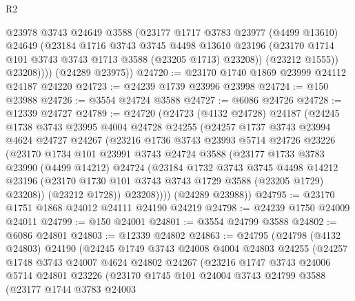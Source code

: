 \begin{lexlean}{R2}
\begin{coremodule}
              @23978
              @3743
              @24649
              @3588
              (@23177
                @1717
                @3783
                @23977
                (@4499 @13610)
                @24649
                (@23184
                  @1716
                  @3743
                  @3745
                  @4498
                  @13610
                  @23196
                  (@23170 @1714 @101 @3743 @3743 @1713 @3588 (@23205 @1713) @23208))
                (@23212 @1555))
              @23208))))
      (@24289 @23975))
@24720 := @23170 @1740 @1869 @23999 @24112 @24187 @24220
@24723 := @24239 @1739 @23996 @23998
@24724 := @150 @23988
@24726 := @3554 @24724 @3588
@24727 := @6086 @24726
@24728 := @12339 @24727
@24789 := @24720
    (@24723
      (@4132 @24728)
      @24187
      (@24245
        @1738
        @3743
        @23995
        @4004
        @24728
        @24255
        (@24257
          @1737
          @3743
          @23994
          @4624
          @24727
          @24267
          (@23216
            @1736
            @3743
            @23993
            @5714
            @24726
            @23226
            (@23170
              @1734
              @101
              @23991
              @3743
              @24724
              @3588
              (@23177
                @1733
                @3783
                @23990
                (@4499 @14212)
                @24724
                (@23184
                  @1732
                  @3743
                  @3745
                  @4498
                  @14212
                  @23196
                  (@23170 @1730 @101 @3743 @3743 @1729 @3588 (@23205 @1729) @23208))
                (@23212 @1728))
              @23208))))
      (@24289 @23988))
@24795 := @23170 @1751 @1868 @24012 @24111 @24190 @24219
@24798 := @24239 @1750 @24009 @24011
@24799 := @150 @24001
@24801 := @3554 @24799 @3588
@24802 := @6086 @24801
@24803 := @12339 @24802
@24863 := @24795
    (@24798
      (@4132 @24803)
      @24190
      (@24245
        @1749
        @3743
        @24008
        @4004
        @24803
        @24255
        (@24257
          @1748
          @3743
          @24007
          @4624
          @24802
          @24267
          (@23216
            @1747
            @3743
            @24006
            @5714
            @24801
            @23226
            (@23170
              @1745
              @101
              @24004
              @3743
              @24799
              @3588
              (@23177
                @1744
                @3783
                @24003

\end{coremodule}
\end{lexlean}

